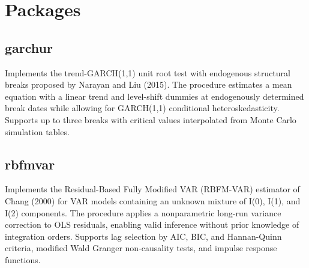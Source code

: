 \section{Packages}\label{packages}

\subsection{garchur}\label{garchur}

Implements the trend-GARCH(1,1) unit root test with endogenous
structural breaks proposed by Narayan and Liu (2015). The procedure
estimates a mean equation with a linear trend and level-shift dummies at
endogenously determined break dates while allowing for GARCH(1,1)
conditional heteroskedasticity. Supports up to three breaks with
critical values interpolated from Monte Carlo simulation tables.

\begin{Shaded}
\begin{Highlighting}[]
\OtherTok{\textless{}{-}}  \NormalTok{, } \NormalTok{)}
\end{Highlighting}
\end{Shaded}

\subsection{rbfmvar}\label{rbfmvar}

Implements the Residual-Based Fully Modified VAR (RBFM-VAR) estimator of
Chang (2000) for VAR models containing an unknown mixture of I(0), I(1),
and I(2) components. The procedure applies a nonparametric long-run
variance correction to OLS residuals, enabling valid inference without
prior knowledge of integration orders. Supports lag selection by AIC,
BIC, and Hannan-Quinn criteria, modified Wald Granger non-causality
tests, and impulse response functions.

